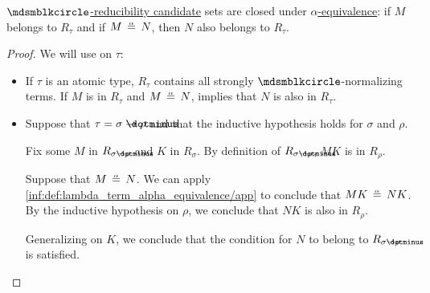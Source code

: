 \begin{lemma}\label{thm:alpha_equivalent_reducibility_candidates}
  \hyperref[def:strong_normalization_reducibility_candidate]{\( \Anon \)-reducibility candidate} sets are closed under \hyperref[def:lambda_term_alpha_equivalence]{\( \alpha \)-equivalence}: if \( M \) belongs to \( R_\tau \) and if \( M \aequiv N \), then \( N \) also belongs to \( R_\tau \).
\end{lemma}
\begin{proof}
  We will use  on \( \tau \):
  \begin{itemize}
    \item If \( \tau \) is an atomic type, \( R_\tau \) contains all strongly \( \Anon \)-normalizing terms. If \( M \) is in \( R_\tau \) and \( M \aequiv N \),  implies that \( N \) is also in \( R_\tau \).

    \item Suppose that \( \tau = \sigma \synimplies \rho \) and that the inductive hypothesis holds for \( \sigma \) and \( \rho \).

    Fix some \( M \) in \( R_{\sigma \synimplies \rho} \) and \( K \) in \( R_\sigma \). By definition of \( R_{\sigma \synimplies \rho} \), \( MK \) is in \( R_\rho \).

    Suppose that \( M \aequiv N \). We can apply \ref{inf:def:lambda_term_alpha_equivalence/app} to conclude that \( MK \aequiv NK \). By the inductive hypothesis on \( \rho \), we conclude that \( NK \) is also in \( R_\rho \).

    Generalizing on \( K \), we conclude that the condition for \( N \) to belong to \( R_{\sigma \synimplies \rho} \) is satisfied.
  \end{itemize}
\end{proof}

